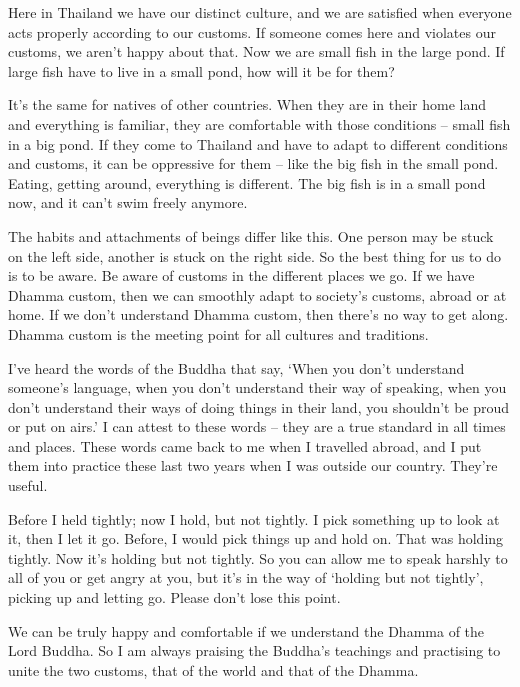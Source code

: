 Here in Thailand we have our distinct culture, and we are satisfied when everyone acts properly according to our customs. If someone comes here and violates our customs, we aren't happy about that. Now we are small fish in the large pond. If large fish have to live in a small pond, how will it be for them?

It's the same for natives of other countries. When they are in their home land and everything is familiar, they are comfortable with those conditions -- small fish in a big pond. If they come to Thailand and have to adapt to different conditions and customs, it can be oppressive for them -- like the big fish in the small pond. Eating, getting around, everything is different. The big fish is in a small pond now, and it can't swim freely anymore.

The habits and attachments of beings differ like this. One person may be stuck on the left side, another is stuck on the right side. So the best thing for us to do is to be aware. Be aware of customs in the different places we go. If we have Dhamma custom, then we can smoothly adapt to society's customs, abroad or at home. If we don't understand Dhamma custom, then there's no way to get along. Dhamma custom is the meeting point for all cultures and traditions.

I've heard the words of the Buddha that say, `When you don't understand someone's language, when you don't understand their way of speaking, when you don't understand their ways of doing things in their land, you shouldn't be proud or put on airs.' I can attest to these words -- they are a true standard in all times and places. These words came back to me when I travelled abroad, and I put them into practice these last two years when I was outside our country. They're useful.

Before I held tightly; now I hold, but not tightly. I pick something up to look at it, then I let it go. Before, I would pick things up and hold on. That was holding tightly. Now it's holding but not tightly. So you can allow me to speak harshly to all of you or get angry at you, but it's in the way of `holding but not tightly', picking up and letting go. Please don't lose this point.

We can be truly happy and comfortable if we understand the Dhamma of the Lord Buddha. So I am always praising the Buddha's teachings and practising to unite the two customs, that of the world and that of the Dhamma.

